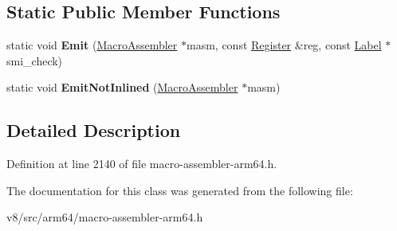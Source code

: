 \subsection*{Static Public Member Functions}
\begin{DoxyCompactItemize}
\item 
\mbox{\label{classv8_1_1internal_1_1InlineSmiCheckInfo_aa1c356dd499384adb172a218e21e0ddf}} 
static void {\bfseries Emit} (\mbox{\hyperlink{classv8_1_1internal_1_1MacroAssembler}{Macro\+Assembler}} $\ast$masm, const \mbox{\hyperlink{classv8_1_1internal_1_1Register}{Register}} \&reg, const \mbox{\hyperlink{classv8_1_1internal_1_1Label}{Label}} $\ast$smi\+\_\+check)
\item 
\mbox{\label{classv8_1_1internal_1_1InlineSmiCheckInfo_a7e57ca150986e9c24803687b1e1f4651}} 
static void {\bfseries Emit\+Not\+Inlined} (\mbox{\hyperlink{classv8_1_1internal_1_1MacroAssembler}{Macro\+Assembler}} $\ast$masm)
\end{DoxyCompactItemize}


\subsection{Detailed Description}


Definition at line 2140 of file macro-\/assembler-\/arm64.\+h.



The documentation for this class was generated from the following file\+:\begin{DoxyCompactItemize}
\item 
v8/src/arm64/macro-\/assembler-\/arm64.\+h\end{DoxyCompactItemize}

